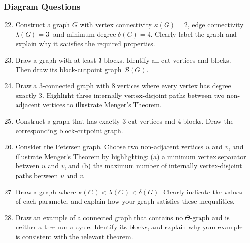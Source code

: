 \documentclass{article}
\theoremstyle{definition}
\begin{document}
\subsubsection{Diagram Questions}
\begin{enumerate}\setcounter{enumi}{21}
\item Construct a graph $G$ with vertex connectivity $\kappa(G) = 2$, edge connectivity $\lambda(G) = 3$, and minimum degree $\delta(G) = 4$. Clearly label the graph and explain why it satisfies the required properties.

\item Draw a graph with at least 3 blocks. Identify all cut vertices and blocks. Then draw its block-cutpoint graph $\mathcal{B}(G)$.

\item Draw a $3$-connected graph with $8$ vertices where every vertex has degree exactly $3$. Highlight three internally vertex-disjoint paths between two non-adjacent vertices to illustrate Menger's Theorem.

\item Construct a graph that has exactly $3$ cut vertices and $4$ blocks. Draw the corresponding block-cutpoint graph.

\item Consider the Petersen graph. Choose two non-adjacent vertices $u$ and $v$, and illustrate Menger's Theorem by highlighting: (a) a minimum vertex separator between $u$ and $v$, and (b) the maximum number of internally vertex-disjoint paths between $u$ and $v$.

\item Draw a graph where $\kappa(G) < \lambda(G) < \delta(G)$. Clearly indicate the values of each parameter and explain how your graph satisfies these inequalities.

\item Draw an example of a connected graph that contains no $\Theta$-graph and is neither a tree nor a cycle. Identify its blocks, and explain why your example is consistent with the relevant theorem.
\end{enumerate}
\end{document}
